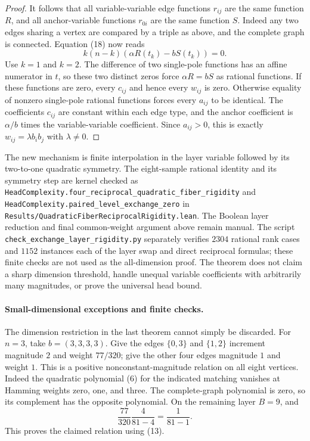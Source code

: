 \documentclass[11pt]{article}
\begin{document}
\begin{proof}
It follows that all variable-variable edge functions $r_{ij}$ are
the same function $R$, and all anchor-variable functions $r_{0i}$
are the same function $S$. Indeed any two edges sharing a vertex
are compared by a triple as above, and the complete graph is connected.
Equation (18) now reads
\[
                       k(n-k)(\alpha R(t_k)-bS(t_k))=0.
\]
Use $k=1$ and $k=2$. The difference of two single-pole functions
has an affine numerator in $t$, so these two distinct zeros force
$\alpha R=bS$ as rational functions. If these functions are zero, every
$c_{ij}$ and hence every $w_{ij}$ is zero. Otherwise equality of
nonzero single-pole rational functions forces every $a_{ij}$ to be
identical. The coefficients $c_{ij}$ are constant within each edge type,
and the anchor coefficient is $\alpha/b$ times the variable-variable
coefficient. Since $a_{ij}>0$, this is exactly
$w_{ij}=\lambda b_i b_j$ with $\lambda\ne0$.
\end{proof}

The new mechanism is finite interpolation in the layer variable followed
by its two-to-one quadratic symmetry. The eight-sample rational identity
and its symmetry step are kernel checked as
\texttt{HeadComplexity.four\_reciprocal\_quadratic\_fiber\_rigidity}
and \texttt{HeadComplexity.paired\_level\_exchange\_zero} in
\texttt{Results/QuadraticFiberReciprocalRigidity.lean}. The Boolean
layer reduction and final common-weight argument above remain manual.
The script \texttt{check\_exchange\_layer\_rigidity.py} separately
verifies $2304$ rational rank cases and $1152$ instances each of the
layer swap and direct reciprocal formulas; these finite checks are not
used as the all-dimension proof. The theorem does not
claim a sharp dimension threshold, handle unequal variable coefficients with
arbitrarily many magnitudes, or prove the universal head bound.

\paragraph{Small-dimensional exceptions and finite checks.}
The dimension restriction in the last theorem cannot simply be
discarded. For $n=3$, take $b=(3,3,3,3)$. Give the edges
$\{0,3\}$ and $\{1,2\}$ increment magnitude $2$ and weight
$77/320$; give the other four edges magnitude $1$ and weight $1$.
This is a positive nonconstant-magnitude relation on all eight
vertices. Indeed the quadratic polynomial (6) for the indicated
matching vanishes at Hamming weights zero, one, and three.
The complete-graph polynomial is zero, so its complement has
the opposite polynomial. On the remaining layer $B=9$, and
\[
             \frac{77}{320}\frac4{81-4}=\frac1{81-1}.
\]
This proves the claimed relation using (13).
\end{document}
